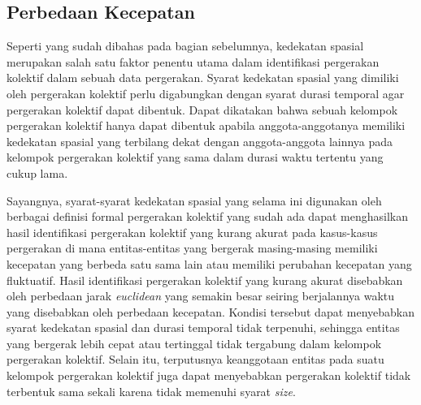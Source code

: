 \subsection{Perbedaan Kecepatan}
\label{subsec:beda-kecepatan}

Seperti yang sudah dibahas pada bagian sebelumnya, kedekatan spasial merupakan salah satu faktor penentu utama dalam identifikasi pergerakan kolektif dalam sebuah data pergerakan. Syarat kedekatan spasial yang dimiliki oleh pergerakan kolektif perlu digabungkan dengan syarat durasi temporal agar pergerakan kolektif dapat dibentuk. Dapat dikatakan bahwa sebuah kelompok pergerakan kolektif hanya dapat dibentuk apabila anggota-anggotanya memiliki kedekatan spasial yang terbilang dekat dengan anggota-anggota lainnya pada kelompok pergerakan kolektif yang sama dalam durasi waktu tertentu yang cukup lama.

Sayangnya, syarat-syarat kedekatan spasial yang selama ini digunakan oleh berbagai definisi formal pergerakan kolektif yang sudah ada dapat menghasilkan hasil identifikasi pergerakan kolektif yang kurang akurat pada kasus-kasus pergerakan di mana entitas-entitas yang bergerak masing-masing memiliki kecepatan yang berbeda satu sama lain atau memiliki perubahan kecepatan yang fluktuatif. Hasil identifikasi pergerakan kolektif yang kurang akurat disebabkan oleh perbedaan jarak \textit{euclidean} yang semakin besar seiring berjalannya waktu yang disebabkan oleh perbedaan kecepatan. Kondisi tersebut dapat menyebabkan syarat kedekatan spasial dan durasi temporal tidak terpenuhi, sehingga entitas yang bergerak lebih cepat atau tertinggal tidak tergabung dalam kelompok pergerakan kolektif. Selain itu, terputusnya keanggotaan entitas pada suatu kelompok pergerakan kolektif juga dapat menyebabkan pergerakan kolektif tidak terbentuk sama sekali karena tidak memenuhi syarat \textit{size}.
    
